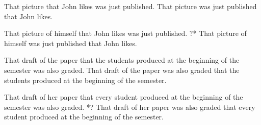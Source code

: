 \begin{exe}
   \ex \begin{xlist}
         \ex \label{controlAsitu} That picture that John likes was just published.
         \ex \label{controlAex} That picture was just published that John likes.
                  \end{xlist}
                  
    \ex \begin{xlist}
         \ex \label{prinAsitu} That picture of himself that John likes was just published.
         \ex \label{prinAex} ?* That picture of himself was just published that John likes.
                  \end{xlist}
         
 
  
\ex  \begin{xlist}
        \ex \label{controlSitu} That draft of the paper that the students produced at the beginning of the semester was also graded.
       \ex \label{controlEx} That draft of the paper was also graded that the students produced at the beginning of the semester.

  \end{xlist}  
         
\ex \begin{xlist}
        \ex \label{boundVarSitu} That draft of her paper that every student produced at the beginning of the semester was also graded.
         \ex \label{boundVarEx} *? That draft of her paper was also graded that every student produced at the beginning of the semester.
 \end{xlist}        
         

\end{exe}

